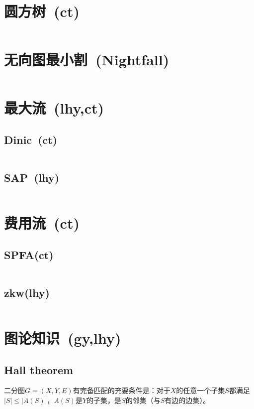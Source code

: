 \section{圆方树\ \small(ct)}
	\inputminted{cpp}{GraphTheory/circle_square_tree.cpp}
\section{无向图最小割\ \small(Nightfall)}
	\inputminted{cpp}{GraphTheory/stoer_wagner.cpp}
\section{最大流\ \small(lhy,ct)}
	\subsection*{Dinic\ \small(ct)}
		\inputminted{cpp}{GraphTheory/dinic.cpp}
	\subsection*{SAP\ \small(lhy)}
		\inputminted{cpp}{GraphTheory/sap.cpp}
\section{费用流\ \small(ct)}
	\subsection*{SPFA(ct)}
		\inputminted{cpp}{GraphTheory/min_cost_max_flow.cpp}
	\subsection*{zkw(lhy)}
		\inputminted{cpp}{GraphTheory/zkw_min_cost_flow.cpp}
\section{图论知识\ \small(gy,lhy)}
	\subsection*{Hall theorem}
		二分图$ G = (X, Y, E) $有完备匹配的充要条件是：对于$ X $的任意一个子集$ S $都满足$ \left| S \right| \leq \left| A(S) \right| $，$ A(S) $是$ Y $的子集，是$ S $的邻集（与$ S $有边的边集）。
